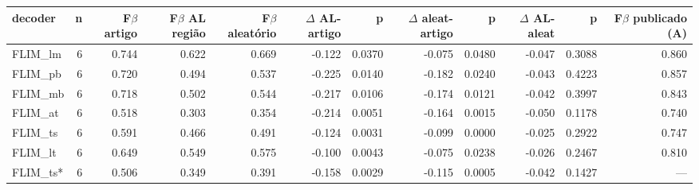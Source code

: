 \begin{tabular}{lrrrrrrrrrrr}
\hline
decoder & n & F$\beta$ artigo & F$\beta$ AL região & F$\beta$ aleatório & $\Delta$ AL-artigo & p & $\Delta$ aleat-artigo & p  & $\Delta$ AL-aleat & p   & F$\beta$ publicado (A) \\
\hline
FLIM\_lm & 6 & 0.744 & 0.622 & 0.669 & -0.122 & 0.0370 & -0.075 & 0.0480 & -0.047 & 0.3088 & 0.860 \\
FLIM\_pb & 6 & 0.720 & 0.494 & 0.537 & -0.225 & 0.0140 & -0.182 & 0.0240 & -0.043 & 0.4223 & 0.857 \\
FLIM\_mb & 6 & 0.718 & 0.502 & 0.544 & -0.217 & 0.0106 & -0.174 & 0.0121 & -0.042 & 0.3997 & 0.843 \\
FLIM\_at & 6 & 0.518 & 0.303 & 0.354 & -0.214 & 0.0051 & -0.164 & 0.0015 & -0.050 & 0.1178 & 0.740 \\
FLIM\_ts & 6 & 0.591 & 0.466 & 0.491 & -0.124 & 0.0031 & -0.099 & 0.0000 & -0.025 & 0.2922 & 0.747 \\
FLIM\_lt & 6 & 0.649 & 0.549 & 0.575 & -0.100 & 0.0043 & -0.075 & 0.0238 & -0.026 & 0.2467 & 0.810 \\
FLIM\_ts* & 6 & 0.506 & 0.349 & 0.391 & -0.158 & 0.0029 & -0.115 & 0.0005 & -0.042 & 0.1427 & --- \\
\hline
\end{tabular}
